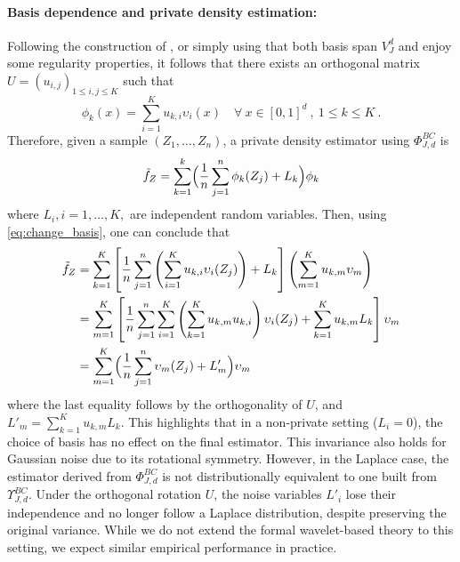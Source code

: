 \documentclass{article}
\newcommand{\1}{\mathds{1}}
\theoremstyle{plain}
\theoremstyle{definition}
\theoremstyle{remark}
\begin{document}
\paragraph{Basis dependence and private density estimation: }  Following the construction of \cite{cohen1993wavelets}, or simply using that both basis span $V_J^d$ and enjoy some regularity properties, it follows that there exists an orthogonal matrix $U = (u_{i,j})_{1\leq i,j\leq K}$ such that 
\begin{equation}\label{eq:change_basis}
   \phi_k(x) = \sum_{i=1}^K u_{k,i}\upsilon_i(x) \quad \forall \ x \in [0,1]^d \ , \ 1\leq k \leq K \ . 
\end{equation} 
Therefore, given a sample $(Z_1,\ldots,Z_n)$, a private density estimator using $\Phi_{J,d}^{BC}$ is
\begin{equation}
   \tilde f_Z = \sum_{k=1}^k \Bigl( \frac{1}{n}\sum_{j=1}^n \phi_k(Z_j) + L_k \Bigr) \phi_k 
\end{equation}
where $L_i, i=1, \ldots, K,$ are independent  random variables. Then, using \eqref{eq:change_basis}, one can conclude that
\begin{align}
\tilde f_Z &= \sum_{k=1}^K \left[ \frac{1}{n} \sum_{j=1}^n \left( \sum_{i=1}^K u_{k,i} \upsilon_i(Z_j) \right) + L_k \right] \left( \sum_{m=1}^K u_{k,m} \upsilon_m \right) \label{eq:substitution} \\
&= \sum_{m=1}^K \left[ \frac{1}{n}\sum_{j=1}^n\sum_{i=1}^K \left( \sum_{k=1}^K u_{k,m} u_{k,i} \right) \upsilon_i(Z_j) + \sum_{k=1}^K u_{k,m} L_k \right] \upsilon_m \label{eq:rearrangement} \\
&= \sum_{m=1}^K  \Bigl( \frac{1}{n}\sum_{j=1}^n \upsilon_m(Z_j) + L'_m \Bigr)\upsilon_m \label{eq:final_form}
\end{align}
where the last equality follows by the orthogonality of $U$, and $L'_m = \sum_{k=1}^K u_{k,m} L_k$.  This  highlights that in a non-private setting ($L_i = 0$), the choice of basis has no effect on the final estimator. This invariance also holds for Gaussian noise due to its rotational symmetry. However, in the Laplace case, the estimator derived from $\Phi_{J,d}^{BC}$ is not distributionally equivalent to one built from $\Upsilon_{J,d}^{BC}$. Under the orthogonal rotation $U$, the noise variables $L'_i$ lose their independence and no longer follow a Laplace distribution, despite preserving the original variance. While we do not extend the formal wavelet-based theory to this setting, we expect similar empirical performance in practice.
\end{document}
